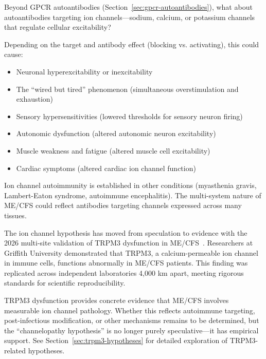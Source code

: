 \begin{open_question}
Beyond GPCR autoantibodies (Section~\ref{sec:gpcr-autoantibodies}), what about autoantibodies targeting ion channels---sodium, calcium, or potassium channels that regulate cellular excitability?

Depending on the target and antibody effect (blocking vs. activating), this could cause:
\begin{itemize}
    \item Neuronal hyperexcitability or inexcitability
    \item The ``wired but tired'' phenomenon (simultaneous overstimulation and exhaustion)
    \item Sensory hypersensitivities (lowered thresholds for sensory neuron firing)
    \item Autonomic dysfunction (altered autonomic neuron excitability)
    \item Muscle weakness and fatigue (altered muscle cell excitability)
    \item Cardiac symptoms (altered cardiac ion channel function)
\end{itemize}

Ion channel autoimmunity is established in other conditions (myasthenia gravis, Lambert-Eaton syndrome, autoimmune encephalitis). The multi-system nature of ME/CFS could reflect antibodies targeting channels expressed across many tissues.
\end{open_question}

\begin{achievement}
The ion channel hypothesis has moved from speculation to evidence with the 2026 multi-site validation of TRPM3 dysfunction in ME/CFS~\cite{Sasso2026trpm3}. Researchers at Griffith University demonstrated that TRPM3, a calcium-permeable ion channel in immune cells, functions abnormally in ME/CFS patients. This finding was replicated across independent laboratories 4,000 km apart, meeting rigorous standards for scientific reproducibility.

TRPM3 dysfunction provides concrete evidence that ME/CFS involves measurable ion channel pathology. Whether this reflects autoimmune targeting, post-infectious modification, or other mechanisms remains to be determined, but the ``channelopathy hypothesis'' is no longer purely speculative---it has empirical support. See Section~\ref{sec:trpm3-hypotheses} for detailed exploration of TRPM3-related hypotheses.
\end{achievement}

